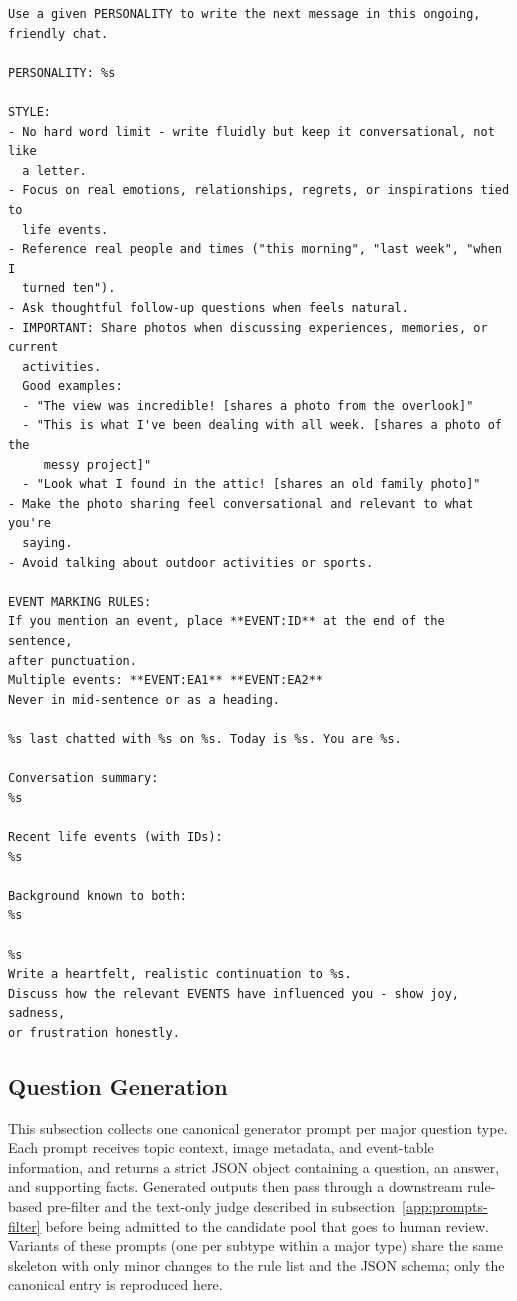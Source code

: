 \documentclass{article}
\begin{document}
\begin{promptbox}[colback=black!5, colframe=white!40!black, title=Haystack: Persona-Driven Dialogue Turn]{}
\scriptsize
\begin{verbatim}
Use a given PERSONALITY to write the next message in this ongoing,
friendly chat.

PERSONALITY: %s

STYLE:
- No hard word limit - write fluidly but keep it conversational, not like
  a letter.
- Focus on real emotions, relationships, regrets, or inspirations tied to
  life events.
- Reference real people and times ("this morning", "last week", "when I
  turned ten").
- Ask thoughtful follow-up questions when feels natural.
- IMPORTANT: Share photos when discussing experiences, memories, or current
  activities.
  Good examples:
  - "The view was incredible! [shares a photo from the overlook]"
  - "This is what I've been dealing with all week. [shares a photo of the
     messy project]"
  - "Look what I found in the attic! [shares an old family photo]"
- Make the photo sharing feel conversational and relevant to what you're
  saying.
- Avoid talking about outdoor activities or sports.

EVENT MARKING RULES:
If you mention an event, place **EVENT:ID** at the end of the sentence,
after punctuation.
Multiple events: **EVENT:EA1** **EVENT:EA2**
Never in mid-sentence or as a heading.

%s last chatted with %s on %s. Today is %s. You are %s.

Conversation summary:
%s

Recent life events (with IDs):
%s

Background known to both:
%s

%s
Write a heartfelt, realistic continuation to %s.
Discuss how the relevant EVENTS have influenced you - show joy, sadness,
or frustration honestly.
\end{verbatim}
\end{promptbox}

\subsection{Question Generation}
\label{app:prompts-qg}

This subsection collects one canonical generator prompt per major question type. Each prompt receives topic context, image metadata, and event-table information, and returns a strict JSON object containing a question, an answer, and supporting facts. Generated outputs then pass through a downstream rule-based pre-filter and the text-only judge described in subsection~\ref{app:prompts-filter} before being admitted to the candidate pool that goes to human review. Variants of these prompts (one per subtype within a major type) share the same skeleton with only minor changes to the rule list and the JSON schema; only the canonical entry is reproduced here.
\end{document}
